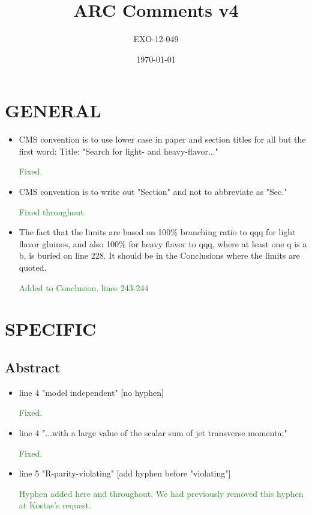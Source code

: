 \documentclass[paper=a4, fontsize=11pt]{scrartcl}
\title{ARC Comments v4}
\author{EXO-12-049}
\date{\today}
\begin{document}
\maketitle
\section{GENERAL}
\begin{itemize}
\item CMS convention is to use lower case in paper and
 section titles for all but the first word:
 Title: "Search for light- and heavy-flavor..."
 
\textcolor{ForestGreen}{Fixed.}
\item CMS convention is to write out "Section" and not to
 abbreviate as "Sec."
 
\textcolor{ForestGreen}{Fixed throughout.}
\item The fact that the limits are based on 100\% branching ratio to qqq for
   light flavor gluinos, and also 100\% for heavy flavor to qqq, where at least 
  one q is a b, is buried on line 228. It should be in the Conclusions 
  where the limits are quoted.
  
\textcolor{ForestGreen}{Added to Conclusion, lines 243-244}
\end{itemize}

\section{SPECIFIC}
\subsection{Abstract}
\begin{itemize}
\item line 4 "model independent" [no hyphen]

\textcolor{ForestGreen}{Fixed.}
\item line 4 "...with a large value of the scalar sum of jet transverse momenta;"

\textcolor{ForestGreen}{Fixed.}
\item line 5 "R-parity-violating" [add hyphen before "violating"]

\textcolor{ForestGreen}{Hyphen added here and throughout.
We had previously removed this hyphen at Kostas's request.}
\end{itemize}
\end{document}
